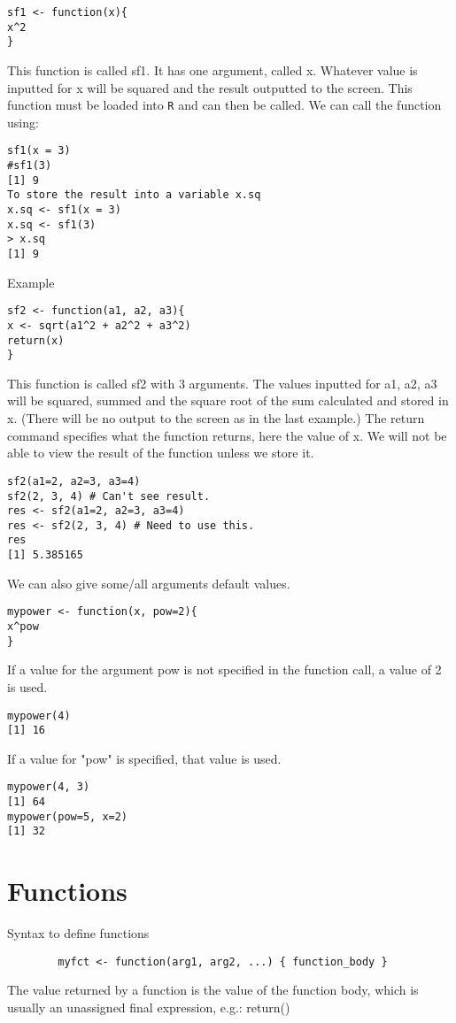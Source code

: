 \begin{verbatim}sf1 <- function(x){
x^2
}
\end{verbatim}

This function is called sf1. It has one argument, called x.
Whatever value is inputted for x will be squared and the result outputted to the screen. This function must be loaded into \texttt{R} and can then be called. We can call the function using:
\begin{verbatim}
sf1(x = 3)
#sf1(3)
[1] 9
To store the result into a variable x.sq
x.sq <- sf1(x = 3)
x.sq <- sf1(3)
> x.sq
[1] 9
\end{verbatim}
Example
\begin{verbatim}
sf2 <- function(a1, a2, a3){
x <- sqrt(a1^2 + a2^2 + a3^2)
return(x)
}
\end{verbatim}

This function is called sf2 with 3 arguments. The values inputted for a1, a2, a3 will be squared, summed and the square root of the sum calculated and stored in x. (There will be no output to the screen as in the last example.)
The return command specifies what the function returns, here the value of x. We will not be able to view the result of the function unless we store it.
\begin{verbatim}sf2(a1=2, a2=3, a3=4)
sf2(2, 3, 4) # Can't see result.
res <- sf2(a1=2, a2=3, a3=4)
res <- sf2(2, 3, 4) # Need to use this.
res
[1] 5.385165
\end{verbatim}
We can also give some/all arguments default values.
\begin{verbatim}mypower <- function(x, pow=2){
x^pow
}
\end{verbatim}
If a value for the argument pow is not specified in the function call,
a value of 2 is used.
\begin{verbatim}mypower(4)
[1] 16
\end{verbatim}
If a value for "pow" is specified, that value is used.
\begin{verbatim}
mypower(4, 3)
[1] 64
mypower(pow=5, x=2)
[1] 32
\end{verbatim}


\section{Functions}
Syntax to define functions

\begin{myindentpar}{1cm}
\begin{verbatim}
        myfct <- function(arg1, arg2, ...) { function_body }
\end{verbatim}
\end{myindentpar}
The value returned by a function is the value of the function body, which is usually an unassigned final expression, e.g.: return()

